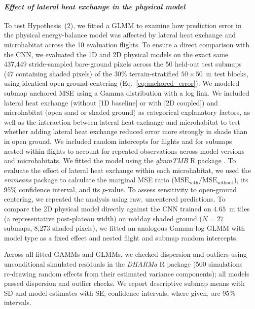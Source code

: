 \documentclass[12pt]{article}
\begin{document}
\paragraph*{\textit{Effect of lateral heat exchange in the physical model}}
To test Hypothesis~(2), we fitted a GLMM to examine how prediction error in the physical energy-balance model was affected by lateral heat exchange and microhabitat across the 10 evaluation flights. To ensure a direct comparison with the CNN, we evaluated the 1D and 2D physical models on the exact same 437,449 stride-sampled bare-ground pixels across the 50 held-out test submaps (47 containing shaded pixels) of the 30\% terrain-stratified $50\times50$~m test blocks, using identical open-ground centering (Eq.~\ref{eq:anchored_error}). We modeled submap anchored MSE using a Gamma distribution with a log link. We included lateral heat exchange (without [1D baseline] or with [2D coupled]) and microhabitat (open sand or shaded ground) as categorical explanatory factors, as well as the interaction between lateral heat exchange and microhabitat to test whether adding lateral heat exchange reduced error more strongly in shade than in open ground. We included random intercepts for flights and for submaps nested within flights to account for repeated observations across model versions and microhabitats. We fitted the model using the \textit{glmmTMB} R package \citep{brooks2017glmmtmb}. To evaluate the effect of lateral heat exchange within each microhabitat, we used the \textit{emmeans} package \citep{Lenth2024emmeans} to calculate the marginal MSE ratio ($\text{MSE}_\text{with} / \text{MSE}_\text{without}$), its 95\% confidence interval, and its $p$-value. To assess sensitivity to open-ground centering, we repeated the analysis using raw, uncentered predictions. To compare the 2D physical model directly against the CNN trained on $4.65$~m tiles (a representative post-plateau width) on midday shaded ground ($N = 27$ submaps, 8,273 shaded pixels), we fitted an analogous Gamma-log GLMM with model type as a fixed effect and nested flight and submap random intercepts.

Across all fitted GAMMs and GLMMs, we checked dispersion and outliers using unconditional simulated residuals in the \textit{DHARMa} R package \citep{Hartig2024DHARMa} (500 simulations re-drawing random effects from their estimated variance components); all models passed dispersion and outlier checks. We report descriptive submap means with SD and model estimates with SE; confidence intervals, where given, are 95\% intervals.
\end{document}
